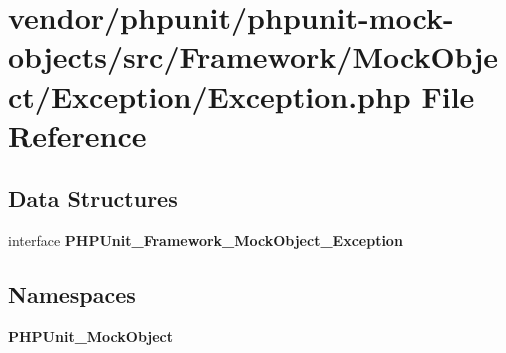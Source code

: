 \section{vendor/phpunit/phpunit-\/mock-\/objects/src/\+Framework/\+Mock\+Object/\+Exception/\+Exception.php File Reference}
\label{phpunit_2phpunit-mock-objects_2src_2_framework_2_mock_object_2_exception_2_exception_8php}
\subsection*{Data Structures}
\begin{DoxyCompactItemize}
\item 
interface {\bf P\+H\+P\+Unit\+\_\+\+Framework\+\_\+\+Mock\+Object\+\_\+\+Exception}
\end{DoxyCompactItemize}
\subsection*{Namespaces}
\begin{DoxyCompactItemize}
\item 
 {\bf P\+H\+P\+Unit\+\_\+\+Mock\+Object}
\end{DoxyCompactItemize}
